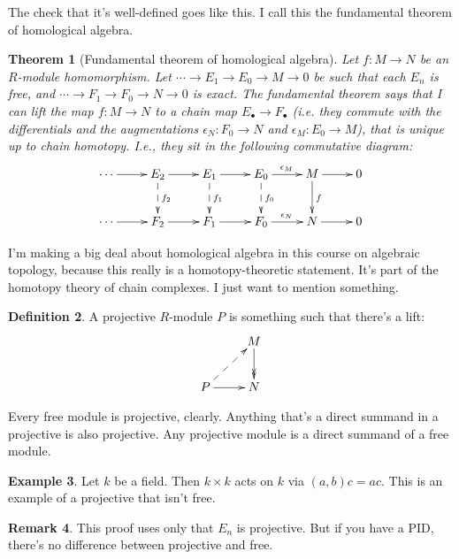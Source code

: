 \documentclass{amsart}
\theoremstyle{theorem}
\newtheorem{theorem}{Theorem}[section]
\theoremstyle{definition}
\newtheorem{definition}[theorem]{Definition}
\newtheorem{remark}[theorem]{Remark}
\newtheorem{example}[theorem]{Example}
\begin{document}
The check that it's well-defined goes like this. I call this the fundamental theorem of homological algebra.
\begin{theorem}[Fundamental theorem of homological algebra]
Let $f:M\to N$ be an $R$-module homomorphism. Let $\cdots\to E_1\to E_0\to M\to 0$ be such that each $E_n$ is free, and $\cdots\to F_1\to F_0\to N\to 0$ is exact. The fundamental theorem says that I can lift the map $f:M\to N$ to a chain map $E_\bullet\to F_\bullet$ (i.e. they commute with the differentials and the augmentations $\epsilon_N:F_0\to N$ and $\epsilon_M:E_0\to M$), that is unique up to chain homotopy. I.e., they sit in the following commutative diagram:
\begin{equation*}
\xymatrix{\cdots\ar[r] & E_2\ar[r]\ar@{-->}[d]^{f_2} & E_1\ar[r]\ar@{-->}[d]^{f_1} & E_0\ar[r]^{\epsilon_M}\ar@{-->}[d]^{f_0} & M\ar[d]^f\ar[r] & 0\\
\cdots\ar[r] & F_2\ar[r] & F_1\ar[r] & F_0\ar[r]^{\epsilon_N} & N\ar[r] & 0}
\end{equation*}
\end{theorem}
I'm making a big deal about homological algebra in this course on algebraic topology, because this really is a homotopy-theoretic statement. It's part of the homotopy theory of chain complexes. I just want to mention something.
\begin{definition}
A projective $R$-module $P$ is something such that there's a lift:
\begin{equation*}
\xymatrix{ & M\ar@{->>}[d]\\
P\ar@{-->}[ur]\ar[r] & N}
\end{equation*}
\end{definition}
Every free module is projective, clearly. Anything that's a direct summand in a projective is also projective. Any projective module is a direct summand of a free module.
\begin{example}
Let $k$ be a field. Then $k\times k$ acts on $k$ via $(a,b)c=ac$. This is an example of a projective that isn't free.
\end{example}
\begin{remark}
This proof uses only that $E_n$ is projective. But if you have a PID, there's no difference between projective and free.
\end{remark}
\end{document}
